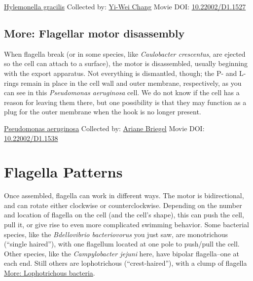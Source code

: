 \documentclass[]{tufte-book}
\begin{document}
\hypertarget{htmlwidget-243c07cf1ae04043c29f}{}

\label{fig:6-3}\protect\hyperlink{tree}{Hylemonella gracilis} Collected by: \protect\hyperlink{yi-wei_chang}{Yi-Wei Chang} Movie DOI: \href{https://doi.org/10.22002/D1.1527}{10.22002/D1.1527}

\hypertarget{Flagellar_motor_disassembly}{%
\subsection*{More: Flagellar motor disassembly}\label{Flagellar_motor_disassembly}}

When flagella break (or in some species, like \emph{Caulobacter crescentus}, are ejected so the cell can attach to a surface), the motor is disassembled, usually beginning with the export apparatus. Not everything is dismantled, though; the P- and L-rings remain in place in the cell wall and outer membrane, respectively, as you can see in this \emph{Pseudomonas aeruginosa} cell. We do not know if the cell has a reason for leaving them there, but one possibility is that they may function as a plug for the outer membrane when the hook is no longer present.



\hypertarget{htmlwidget-6122142f05cd3dc3b92f}{}

\label{fig:6-3a}\protect\hyperlink{tree}{Pseudomonas aeruginosa} Collected by: \protect\hyperlink{ariane_briegel}{Ariane Briegel} Movie DOI: \href{https://doi.org/10.22002/D1.1538}{10.22002/D1.1538}

\hypertarget{flagella-patterns}{%
\section{Flagella Patterns}\label{flagella-patterns}}

Once assembled, flagella can work in different ways. The motor is bidirectional, and can rotate either clockwise or counterclockwise. Depending on the number and location of flagella on the cell (and the cell's shape), this can push the cell, pull it, or give rise to even more complicated swimming behavior. Some bacterial species, like the \emph{Bdellovibrio bacteriovorus} you just saw, are monotrichous (``single haired''), with one flagellum located at one pole to push/pull the cell. Other species, like the \emph{Campylobacter jejuni} here, have bipolar flagella--one at each end. Still others are lophotrichous (``crest-haired''), with a clump of flagella \protect\hyperlink{Lophotrichous_bacteria}{More: Lophotrichous bacteria}.
\end{document}
